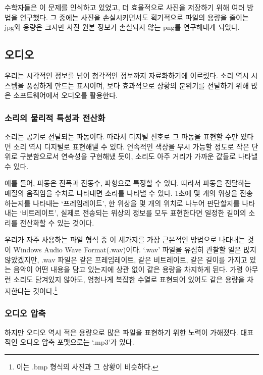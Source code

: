 \documentclass{article}
\begin{document}
수학자들은 이 문제를 인식하고 있었고, 더 효율적으로 사진을 저장하기 위해 여러 방법을 연구했다.
그 중에는 사진을 손실시키면서도 획기적으로 파일의 용량을 줄이는 jpg와 용량은 크지만 사진 원본
정보가 손실되지 않는 png를 연구해내게 되었다.

\subsection{오디오}

우리는 시각적인 정보를 넘어 청각적인 정보까지 자료화하기에 이르렀다. 소리 역시 시스템을 풍성하게
만드는 표시이며, 보다 효과적으로 상황의 분위기를 전달하기 위해 많은 소프트웨어에서 오디오를 활용한다.

\subsubsection{소리의 물리적 특성과 전산화}

소리는 공기로 전달되는 파동이다. 따라서 디지털 신호로 그 파동을 표현할 수만 있다면 소리 역시
디지털로 표현해낼 수 있다.
연속적인 색상을 무시 가능할 정도로 작은 단위로 구분함으로서 연속성을 구현해냈 듯이, 소리도 아주
거리가 가까운 값들로 나타낼 수 있다.

예를 들어, 파동은 진폭과 진동수, 파형으로 특정할 수 있다. 따라서 파동을 전달하는 매질의 움직임을
수치로 나타내면 소리를 나타낼 수 있다.
1초에 몇 개의 위상을 전송하는지를 나타내는 `프레임레이트', 한 위상을 몇 개의 위치로 나누어 판단할지를
나타내는 `비트레이트', 실제로 전송되는 위상의 정보를 모두 표현한다면 일정한 길이의 소리를 전산화할
수 있는 것이다.

우리가 자주 사용하는 파일 형식 중 이 세가지를 가장 근본적인 방법으로 나타내는 것이
Windows Audio Wave Format(.wav)이다. `.wav' 파일을 유심히 관찰할 일은 많지 않았겠지만,
.wav 파일은 같은 프레임레이트, 같은 비트레이트, 같은 길이를 가지고 있는 음악이 어떤 내용을
담고 있는지에 상관 없이 같은 용량을 차지하게 된다.
가령 아무런 소리도 담겨있지 않아도, 엄청나게 복잡한 수열로 표현되어 있어도 같은 용량을 차지한다는
것이다.\footnote{이는 .bmp 형식의 사진과 그 상황이 비슷하다.}

\subsubsection{오디오 압축}

하지만 오디오 역시 적은 용량으로 많은 파일을 표현하기 위한 노력이 가해졌다.
대표적인 오디오 압축 포맷으로는 `.mp3'가 있다.

\end{document}
